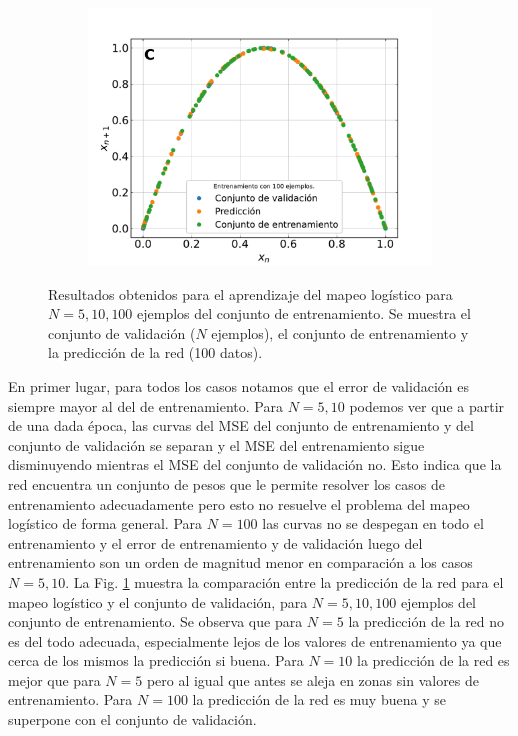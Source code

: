 \documentclass[11pt,twocolumn,twoside]{opticajnl}
\begin{document}
\begin{figure}[ht]
\begin{subfigure}[b]{0.3\linewidth}
            \includegraphics[width=\textwidth]{Figuras/logmap_100_tests_ej3.pdf}
         \end{subfigure}
    \caption{Resultados obtenidos para el aprendizaje del mapeo logístico para $N=5,10,100$ ejemplos del conjunto de entrenamiento. Se muestra el conjunto de validación ($N$ ejemplos), el conjunto de entrenamiento y la predicción de la red (100 datos).} 
    \label{fig:logmap_3}
\end{figure}
En primer lugar, para todos los casos notamos que el error de validación es siempre mayor al del de entrenamiento. Para $N = 5,10$ podemos ver que a partir de una dada época, las curvas del MSE del conjunto de entrenamiento y del conjunto de validación se separan y el MSE del entrenamiento sigue disminuyendo mientras el MSE del conjunto de validación no. Esto indica que la red encuentra un conjunto de pesos que le permite resolver los casos de entrenamiento adecuadamente pero esto no resuelve el problema del mapeo logístico de forma general. Para $N=100$ las curvas no se despegan en todo el entrenamiento y el error de entrenamiento y de validación luego del entrenamiento son un orden de magnitud menor en comparación a los casos $N = 5,10$. La Fig. \ref{fig:logmap_3} muestra la comparación entre la predicción de la red para el mapeo logístico y el conjunto de validación, para $N=5,10,100$ ejemplos del conjunto de entrenamiento. Se observa que para $N=5$ la predicción de la red no es del todo adecuada, especialmente lejos de los valores de entrenamiento ya que cerca de los mismos la predicción si buena. Para $N=10$ la predicción de la red es mejor que para $N=5$ pero al igual que antes se aleja en zonas sin valores de entrenamiento. Para $N=100$ la predicción de la red es muy buena y se superpone con el conjunto de validación. 
\end{document}
